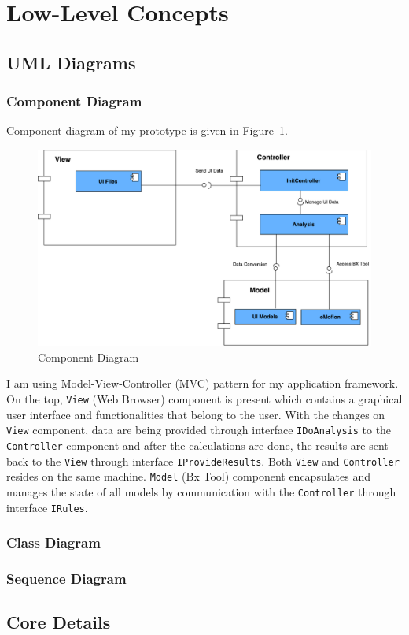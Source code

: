 \section{Low-Level Concepts}\label{sec:lowlevel}

\subsection{UML Diagrams}\label{subsec:umldiagrams}
\subsubsection{Component Diagram}\label{subsubsec:component}
Component diagram of my prototype is given in Figure~\ref{fig:Component_Diagram}.
\begin{figure}
	\includegraphics[width=1\textwidth]{figures/Component_Diagram}
	\caption{Component Diagram}
	\label{fig:Component_Diagram}
\end{figure}

I am using Model-View-Controller (MVC) pattern for my application framework. 
On the top, \texttt{View} (Web Browser) component is present which contains a graphical user interface and functionalities that belong to the user. With the changes on \texttt{View} component, data are being provided through interface \texttt{IDoAnalysis} to the \texttt{Controller} component and after the calculations are done, the results are sent back to the \texttt{View} through interface \texttt{IProvideResults}. Both \texttt{View} and \texttt{Controller} resides on the same machine. \texttt{Model} (Bx Tool) component encapsulates and manages the state of all models by communication with the \texttt{Controller} through interface \texttt{IRules}.
\subsubsection{Class Diagram}\label{subsubsec:classes}
\subsubsection{Sequence Diagram}\label{subsubsec:sequence}

\subsection{Core Details}\label{subsec:coredetails}

 



